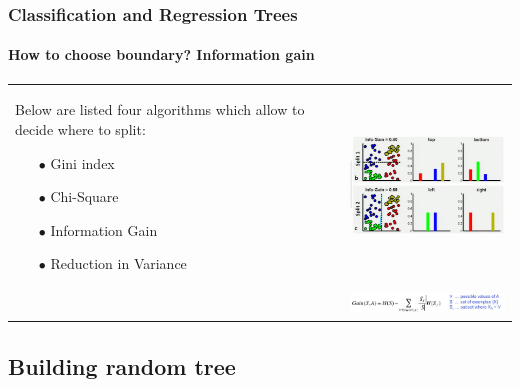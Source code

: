 \begin{frame}
	\frametitle{Classification and Regression Trees}
		\framesubtitle{How to choose boundary? 
		Information gain}

		\begin{center}
		\begin{tabular}{m{4cm} m{6cm}}
		Below are listed four algorithms which allow to decide where to split:
		\begin{itemize}
		  \item[$\bullet$]  Gini index
		  \item[$\bullet$]  Chi-Square
		  \item[$\bullet$]  Information Gain
		  \item[$\bullet$]  Reduction in Variance
		\end{itemize}
		&
		\includegraphics[width=6cm]{./figures/pastedImage2}\\
		&
		\includegraphics[width=6cm]{./figures/pastedImage3}
		\\
		\end{tabular}
		\end{center}
		
\end{frame}

\subsection{Building random tree} %

